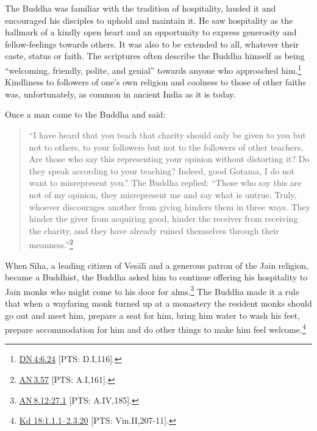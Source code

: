 \documentclass[10pt, openright]{book}
\begin{document}
The Buddha was familiar with the tradition of hospitality, lauded it and encouraged his disciples to uphold and maintain it. He saw hospitality as the hallmark of a kindly open heart and an opportunity to express generosity and fellow-feelings towards others. It was also to be extended to all, whatever their caste, status or faith. The scriptures often describe the Buddha himself as being “welcoming, friendly, polite, and genial” towards anyone who approached him.\footnote {\href{https://suttacentral.net/dn4/en/sujato\#6.24}{DN 4:6.24} [PTS: D.I,116].} Kindliness to followers of one’s own religion and coolness to those of other faiths was, unfortunately, as common in ancient India as it is today.


Once a man came to the Buddha and said:


\begin{quote}

\hspace{-0.4em}“I have heard that you teach that charity should only be given to you but not to others, to your followers but not to the followers of other teachers. Are those who say this representing your opinion without distorting it? Do they speak according to your teaching? Indeed, good Gotama, I do not want to misrepresent you.” The Buddha replied: “Those who say this are not of my opinion, they misrepresent me and say what is untrue. Truly, whoever discourages another from giving hinders them in three ways. They hinder the giver from acquiring good, hinder the receiver from receiving the charity, and they have already ruined themselves through their meanness.”\footnote {\href{https://suttacentral.net/an3.57/en/sujato}{AN 3.57} [PTS: A.I,161].}


\end{quote}
When Sīha, a leading citizen of Vesālī and a generous patron of the Jain religion, became a Buddhist, the Buddha asked him to continue offering his hospitality to Jain monks who might come to his door for alms.\footnote {\href{https://suttacentral.net/an8.12/en/sujato\#27.1}{AN 8.12:27.1} [PTS: A.IV,185].} The Buddha made it a rule that when a wayfaring monk turned up at a monastery the resident monks should go out and meet him, prepare a seat for him, bring him water to wash his feet, prepare accommodation for him and do other things to make him feel welcome.\footnote {\href{https://suttacentral.net/pli-tv-kd18/en/brahmali#1.1.1}{Kd 18:1.1.1–2.3.20} [PTS: Vin.II,207-11].}
\end{document}
